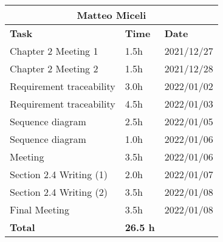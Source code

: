 \begin{table}[H]
\centering
\begin{tabular}{|p{}|p{}|p{}|}
\hline
\multicolumn{3}{|c|}{\textbf{Matteo Miceli}}            \\ \hline
\textbf{Task}                   & \textbf{Time} & \textbf{Date} \\ \hline

Chapter 2 Meeting 1				&		1.5h	   &	2021/12/27 \\ \hline
Chapter 2 Meeting 2				&		1.5h	   &	2021/12/28 \\ \hline
Requirement traceability		&		3.0h	   &	2022/01/02 \\ \hline
Requirement traceability		&		4.5h	   &	2022/01/03 \\ \hline
Sequence diagram 				&		2.5h	   &	2022/01/05 \\ \hline
Sequence diagram 				&		1.0h	   &	2022/01/06 \\ \hline
Meeting							&		3.5h	   &	2022/01/06 \\ \hline
Section 2.4 Writing	(1)			&		2.0h	   &	2022/01/07 \\ \hline
Section 2.4 Writing	(2)		 	&		3.5h	   &	2022/01/08 \\ \hline
Final Meeting					&		3.5h	   &	2022/01/08 \\ \hline

\textbf{Total}                  		&  \textbf{26.5 h}   & \\ \hline
\end{tabular}
\end{table}
